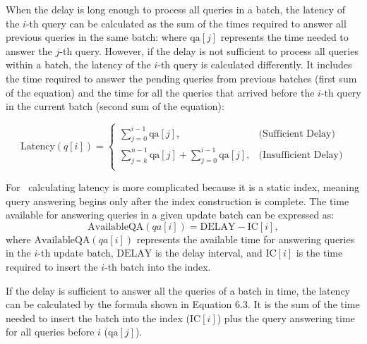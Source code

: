 When the delay is long enough to process all queries in a batch, the latency of the 
$i$-th query can be calculated as the sum of the times required to answer all previous 
queries in the same batch:
% 
where $\text{qa}[j]$ represents the time needed to answer the $j$-th query.
% 
However, if the delay is not sufficient to process all queries within a batch, 
the latency of the $i$-th query is calculated differently. It includes the time 
required to answer the pending queries from previous batches (first sum of the equation) 
and the time for all the queries that arrived before the $i$-th query in the current batch
(second sum of the equation):


\begin{equation}
\text{Latency}(q[i]) =
\begin{cases}
    \sum_{j=0}^{i-1} \text{qa}[j], & \text{(Sufficient Delay)} \\[10pt]
    \sum_{j=k}^{n-1} \text{qa}[j] + \sum_{j=0}^{i-1} \text{qa}[j], & \text{(Insufficient Delay)}  \\[10pt]
\end{cases}
\end{equation}
\begin{center}
\end{center} 
% 

For \Fresh\, calculating latency is more complicated because it is a static index, meaning 
query answering begins only after the index construction is complete. The time available 
for answering queries in a given update batch can be expressed as:
\begin{equation}
\text{AvailableQA}(qa[i]) = \text{DELAY} - \text{IC}[i],
\end{equation}
% 
where $\text{AvailableQA}(qa[i])$ represents the available time for answering queries 
in the $i$-th update batch, $\text{DELAY}$ is the delay interval, and $\text{IC}[i]$ 
is the time required to insert the $i$-th batch into the index.
 
If the delay is sufficient to answer all the queries of a batch in time, the latency
can be calculated by the formula shown in Equation 6.3. It is the sum
of the time needed to insert the batch into the index ($\text{IC}[i]$) plus the query 
answering time for all queries before $i$ ($\text{qa}[j]$).
 
